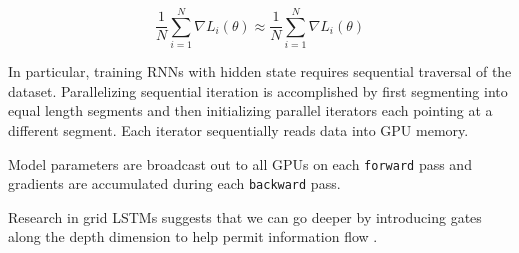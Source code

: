 \documentclass[dissertation.tex]{subfiles}
\begin{document}
\begin{equation}
  \frac{1}{N} \sum_{i=1}^N \nabla L_i(\theta) \approx \frac{1}{N} \sum_{i=1}^N \nabla L_i(\theta)
\end{equation}

In particular, training RNNs with hidden state requires sequential traversal
of the dataset. Parallelizing sequential iteration is accomplished by first segmenting
into equal length segments and then initializing parallel iterators each
pointing at a different segment. Each iterator sequentially reads data
into GPU memory.

Model parameters are broadcast out to all GPUs on each \texttt{forward} pass
and gradients are accumulated during each \texttt{backward} pass.

Research in grid LSTMs suggests that we can go deeper by introducing
gates along the depth dimension to help permit information flow .

\printbibliography
\end{document}
